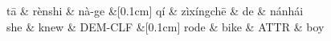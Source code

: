 \documentclass{standalone}
\begin{document}
 
\begin{dependency}[theme = simple, arc edge, arc angle=70, text only label, label style={above, font = \footnotesize} ]
\begin{deptext}[column sep=.1ex, row sep = .15ex]
	t\=a \&  r\`enshi \& n\`a-ge \&[0.1cm] q\'i \& z\`ix\'ingch\=e \& de \& n\'anh\'ai \\
	she \& knew \& DEM-CLF \&[0.1cm] rode \& bike \& ATTR \& boy \\
\end{deptext}
\end{dependency}
\end{document}
